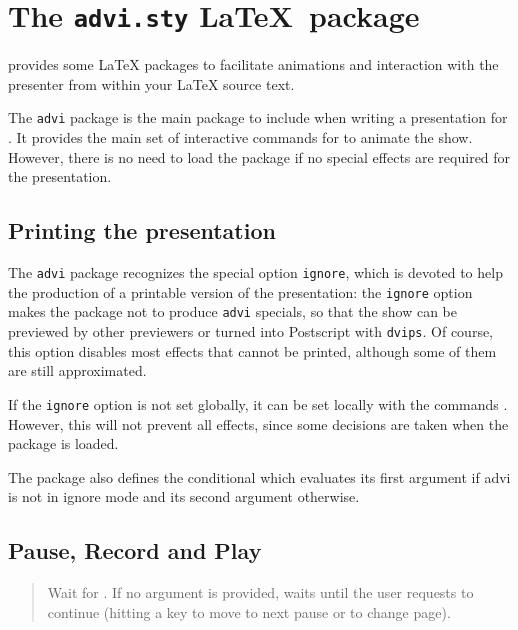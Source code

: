 \documentclass[12pt]{article}
\begin{document}
\section {The {\tt advi.sty} \LaTeX~package}

{\ActiveDVI} provides some {\LaTeX} packages to facilitate animations and
interaction with the presenter from within your {\LaTeX} source text.

The {\tt advi} package is the main package to include when writing
a presentation for \ActiveDVI. It provides the main set of interactive
commands for {\ActiveDVI} to animate the show. However, there is no
need to load the package if no {\ActiveDVI} special effects are
required for the presentation.

\subsection{Printing the presentation}

The {\tt advi} package recognizes the special option \verb"ignore",
which is devoted to help the production of a printable version of the
presentation: the \verb"ignore" option makes the package not to
produce {\tt advi} specials, so that the show can be previewed by
other previewers or turned into Postscript with {\tt dvips}. Of
course, this option disables most effects that cannot be printed,
although some of them are still approximated.

If the {\tt ignore} option is not set globally, it can be set
locally with the commands {\docdef \adviignore}. However, this will not
prevent all effects, since some decisions are taken when the package is
loaded.

The package also defines the conditional {\docdef \ifadvi} which
evaluates its first argument if advi is not in ignore mode and its
second argument otherwise.

\subsection {Pause, Record and Play}

\medskip\noindent
\docdef \adviwait{}
\begin{quote}
Wait for . If no argument is provided, waits until the
user requests to continue (hitting a key to move to next pause or to
change page).
\end{quote}
\end{document}
